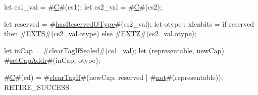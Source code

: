 let cs1_val = #\hyperref[sailRISCVzC]{C}#(cs1);
let cs2_val = #\hyperref[sailRISCVzC]{C}#(cs2);

let reserved = #\hyperref[sailRISCVzhasReservedOType]{hasReservedOType}#(cs2_val);
let otype : xlenbits = if reserved then #\hyperref[sailRISCVzEXTS]{EXTS}#(cs2_val.otype)
                                   else #\hyperref[sailRISCVzEXTZ]{EXTZ}#(cs2_val.otype);

let inCap = #\hyperref[sailRISCVzclearTagIfSealed]{clearTagIfSealed}#(cs1_val);
let (representable, newCap) = #\hyperref[sailRISCVzsetCapAddr]{setCapAddr}#(inCap, otype);

#\hyperref[sailRISCVzC]{C}#(cd) = #\hyperref[sailRISCVzclearTagIf]{clearTagIf}#(newCap, reserved | #\hyperref[sailRISCVznot]{not}#(representable));
RETIRE_SUCCESS
